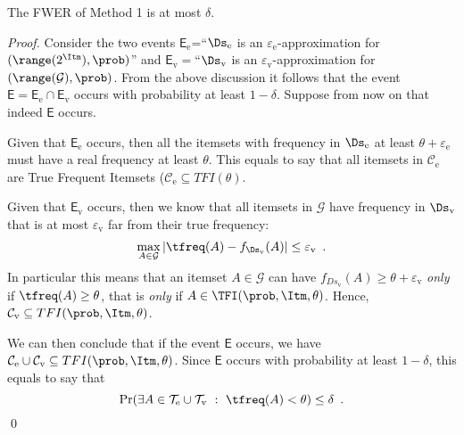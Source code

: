 \begin{lemma}
  The FWER of Method 1 is at most $\delta$.
\end{lemma}
\ifarxiv
\begin{proof}
  Consider the two events $\mathsf{E}_\mathrm{e}$=``$\Ds_\mathrm{e}$ is an
  $\varepsilon_\mathrm{e}$-approximation for $(\range(2^\Itm),\prob)$'' and
  $\mathsf{E}_\mathrm{v}=$``$\Ds_\mathrm{v}$ is an
  $\varepsilon_\mathrm{v}$-approximation for $(\range(\mathcal{G}),\prob)$. From
  the above discussion it follows that the event
  $\mathsf{E}=\mathsf{E}_\mathrm{e}\cap\mathsf{E}_\mathrm{v}$ occurs with probability at least
  $1-\delta$. Suppose from now on that indeed $\mathsf{E}$ occurs.

  Given that $\mathsf{E}_\mathrm{e}$ occurs, then all the itemsets with
  frequency in $\Ds_\mathrm{e}$ at least $\theta+\varepsilon_\mathrm{e}$
  must have a real frequency at least $\theta$. This equals to say that all
  itemsets in $\mathcal{C}_\mathrm{e}$ are True Frequent Itemsets
  ($\mathcal{C}_\mathrm{e}\subseteq TFI(\theta)$.

  Given that $\mathsf{E}_\mathrm{v}$ occurs, then we know that all itemsets in
  $\mathcal{G}$ have frequency in $\Ds_\mathrm{v}$ that is at most
  $\varepsilon_\mathrm{v}$ far from their true frequency:
  \[
  \max_{A\in\mathcal{G}}\left|\tfreq(A)-f_{\Ds_\mathrm{v}}(A)\right|\le\varepsilon_\mathrm{v}\enspace.\]
  In particular this means that an  itemset $A\in\mathcal{G}$ can have
  $f_{Ds_\mathrm{v}}(A)\ge\theta+\varepsilon_\mathrm{v}$ \emph{only} if
  $\tfreq(A)\ge\theta$, that is \emph{only} if $A\in\TFI(\prob,\Itm,\theta)$.
  Hence, $\mathcal{C}_\mathrm{v}\subseteq TFI(\prob,\Itm,\theta)$. 

  We can then conclude that if the event $\mathsf{E}$ occurs, we have
  $\mathcal{C}_\mathrm{e}\cup \mathcal{C}_\mathrm{v}\subseteq TFI(\prob,\Itm,\theta)$.
  Since $\mathsf{E}$ occurs with probability at least $1-\delta$, this equals to
  say that 
  \[
  \Pr(\exists A\in \mathcal{T}_\mathrm{e}\cup
  \mathcal{T}_\mathrm{v} ~:~ \tfreq(A)<\theta)\le\delta\enspace.\]
  \qed
\end{proof}
\fi
